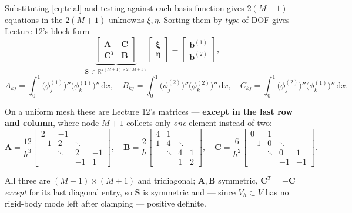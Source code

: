 \documentclass[11pt]{article}
\newcommand{\dx}{\,\mathrm{d}x}
\begin{document}
\begin{steps}
\item Substituting \eqref{eq:trial} and testing against each basis function
      gives $2(M+1)$ equations in the $2(M+1)$ unknowns $\xi,\eta$.  Sorting them by
      \emph{type} of DOF gives Lecture 12's block form
\begin{equation}\label{eq:system}
  \underbrace{\left[\begin{array}{c|c}\bm{A}&\bm{C}\\\hline \bm{C}^{T}&\bm{B}\end{array}\right]}_{\bm{S}\,\in\,\mathbb{R}^{2(M+1)\times2(M+1)}}
  \left[\begin{array}{c}\bm{\xi}\\\hline\bm{\eta}\end{array}\right]
  =\left[\begin{array}{c}\bm{b}^{(1)}\\\hline\bm{b}^{(2)}\end{array}\right],
\end{equation}
\[
  A_{kj}=\int_{0}^{1}\bigl(\phi^{(1)}_{j}\bigr)''\bigl(\phi^{(1)}_{k}\bigr)''\dx,\quad
  B_{kj}=\int_{0}^{1}\bigl(\phi^{(2)}_{j}\bigr)''\bigl(\phi^{(2)}_{k}\bigr)''\dx,\quad
  C_{kj}=\int_{0}^{1}\bigl(\phi^{(2)}_{j}\bigr)''\bigl(\phi^{(1)}_{k}\bigr)''\dx .
\]
\item On a uniform mesh these are Lecture 12's matrices --- \textbf{except in the
      last row and column}, where node $M+1$ collects only \emph{one} element
      instead of two:
\begin{equation}\label{eq:blocks}
  \bm{A}=\frac{12}{h^{3}}\!\begin{bmatrix}
   2&-1& & \\ -1&2&\ddots& \\ &\ddots&2&-1\\ & &-1&\boxed{1}\end{bmatrix}\!,\quad
  \bm{B}=\frac{2}{h}\!\begin{bmatrix}
   4&1& & \\ 1&4&\ddots& \\ &\ddots&4&1\\ & &1&\boxed{2}\end{bmatrix}\!,\quad
  \bm{C}=\frac{6}{h^{2}}\!\begin{bmatrix}
   0&1& & \\ -1&0&\ddots& \\ &\ddots&0&1\\ & &-1&\boxed{-1}\end{bmatrix}\!.
\end{equation}
\item All three are $(M+1)\times(M+1)$ and tridiagonal; $\bm{A},\bm{B}$ symmetric,
      $\bm{C}^{T}=-\bm{C}$ \emph{except} for its last diagonal entry, so
      $\bm{S}$ is symmetric and --- since $V_{h}\subset V$ has no rigid-body
      mode left after clamping --- positive definite.
\end{steps}
\end{document}
